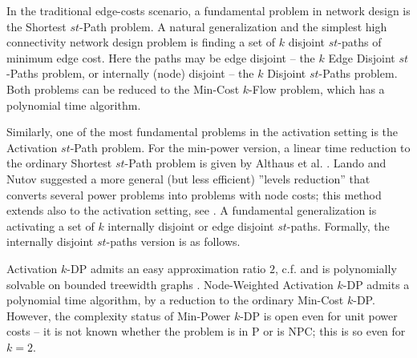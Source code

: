 \documentclass[a4paper,UKenglish,autoref]{lipics-v2019}
\begin{document}
In the traditional edge-costs scenario, 
a fundamental problem in network design is the {\sc Shortest $st$-Path} problem.
A natural generalization and the simplest high connectivity network design problem 
is finding a set of $k$ disjoint $st$-paths of minimum edge cost. 
Here the paths may be edge disjoint -- the {\sc $k$ Edge Disjoint $st$-Paths} problem, 
or internally (node) disjoint -- the {\sc $k$ Disjoint $st$-Paths}  problem.
Both problems can be reduced to the 
{\sc Min-Cost $k$-Flow} problem, which has a polynomial time algorithm.  

Similarly, one of the most fundamental problems in the activation setting is the {\sc Activation $st$-Path} problem. 
For the min-power version, a linear time reduction  to the ordinary {\sc Shortest $st$-Path} problem is given by Althaus et al. \cite{ACMP}. 
Lando and Nutov \cite{LN} suggested a more general (but less efficient) ''levels reduction'' 
that converts several power problems into problems with node costs; this method extends also to the activation setting, see \cite{N-sur}. 
A fundamental generalization is activating a set of $k$ internally disjoint or edge disjoint $st$-paths. 
Formally, the internally disjoint $st$-paths version is as follows. 

\begin{center} \end{center}


{\sc Activation $k$-DP} admits an easy approximation ratio $2$, c.f. \cite[Corollary~15.4]{N-sur}
and is polynomially solvable on bounded treewidth graphs \cite{AE-tw}.
{\sc Node-Weighted Activation $k$-DP} admits a polynomial time algorithm, 
by a reduction to the ordinary {\sc Min-Cost $k$-DP}.  
However, the complexity status of {\sc Min-Power $k$-DP} is open even for unit power costs -- 
it is not known whether the problem is in P or is NPC; this is so even for $k=2$. 
\end{document}
